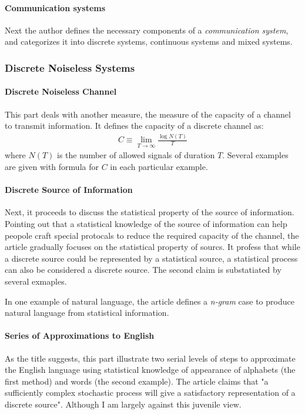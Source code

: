 \documentclass{article}
\numberwithin{equation}{subsection} %
\theoremstyle{definition}
\begin{document}
    \paragraph{Communication systems}
    Next the author defines the necessary components of a \textit{
    communication system}, and categorizes it into discrete systems,
    continuous systems and mixed systems.

    \subsubsection{Discrete Noiseless Systems}

    \paragraph{Discrete Noiseless Channel}
    \label{sec:Discrete Noiseless Channel}
    This part deals with another measure, the measure of the capacity
    of a channel to transmit information. It defines the capacity of a
    discrete channel as:
    \begin{align}
        \label{eq:capacity_of_disc_chan}
        C\equiv \lim_{T\to \infty} \frac{\log N(T)}{T}
    \end{align}
    where $N(T)$ is the number of allowed signals of duration $T$.
    Several examples are given with formula for $C$ in each particular
    example.
    
    \paragraph{Discrete Source of Information}
    Next, it proceeds to discuss the statistical property of the source
    of information. Pointing out that a statistical knowledge of the
    source of information can help peopole craft special protocals to
    reduce the required capacity of the channel, the article gradually
    focuses on the statistical property of sourcs. It profess that while a
    discrete source could be represented by a statistical source, a
    statistical process can also be considered a discrete source. The
    second claim is substatiated by several exmaples.

    In one example of natural language, the article defines a 
    \textit{n-gram} case to produce natural language from statistical
    information.

    \paragraph{Series of Approximations to English}
    As the title suggests, this part illustrate two serial levels of
    steps to approximate the English language using statistical knowledge
    of appearance of alphabets (the first method) and words (the second
    example). The article claims that "a sufficiently complex stochastic 
    process will give a satisfactory representation of a discrete source".
    Although I am largely against this juvenile view.
\end{document}
